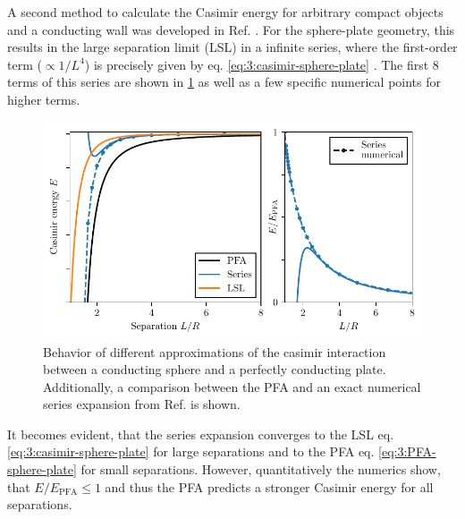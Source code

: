 A second method to calculate the Casimir energy for arbitrary compact objects and a conducting wall was developed in Ref. \cite{Emig_2007}. For the sphere-plate geometry, this results in the large separation limit (LSL) in a infinite series, where the first-order term ($\propto 1/L^4$) is precisely given by eq. \eqref{eq:3:casimir-sphere-plate} \cite{Emig_2007a,Pirozhenko_2013}. The first 8 terms of this series are shown in \cref{fig:3:casimir-behavior} as well as a few specific numerical points for higher terms.
\begin{figure}[!ht]
  \centering
  \includegraphics[width=\textwidth]{./../figures/casimir/casimir-behavior.pdf}
  \caption{Behavior of different approximations of the casimir interaction between a conducting sphere and a perfectly conducting plate. Additionally, a comparison between the PFA and an exact numerical series expansion from Ref. \cite{Emig_2007a} is shown.}
  \label{fig:3:casimir-behavior}
\end{figure}
It becomes evident, that the series expansion converges to the LSL eq. \eqref{eq:3:casimir-sphere-plate} for large separations and to the PFA eq. \eqref{eq:3:PFA-sphere-plate} for small separations.
However, quantitatively the numerics show, that $E/E_\mathrm{PFA} \leq 1$ and thus the PFA predicts a stronger Casimir energy for all separations.

